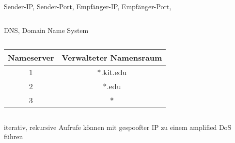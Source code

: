 \documentclass[a4paper]{article}
\begin{document}
\subsection{}
Sender-IP, Sender-Port, Empfänger-IP, Empfänger-Port, 
\subsection{}
DNS, Domain Name System
\subsection{}
\begin{tabular}{|c|c|}\hline
Nameserver & Verwalteter Namensraum \\ \hline
1 & *.kit.edu\\ \hline
2 & *.edu\\ \hline
3 & *\\ \hline
\end{tabular}
\subsection{}
iterativ, rekursive Aufrufe können mit gespoofter IP zu einem amplified DoS führen
\end{document}
